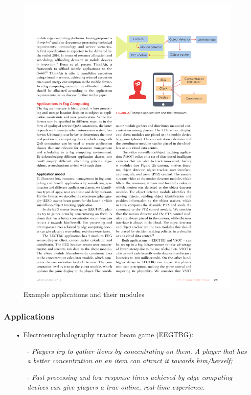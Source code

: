 \documentclass[10pt, pdf, xcolor=pdftex, dvipsnames, table]{beamer}
\begin{document}
\begin{frame}
 	\begin{figure}[htbp]
 		\centerline{\includegraphics[scale=0.9]{images/apps.pdf}}
 		\caption[Example applications and their modules]{Example applications and their modules}
 	\end{figure}
\end{frame}

\begin{frame}
	\frametitle{Applications}
 	\begin{block}{}
 		\begin{itemize}
 		    \item[•] Electroencephalography tractor beam game (EEGTBG):\newline
 				\begin{itemize}
 		    		\item[-] \footnotesize\textit{Players try to gather items by concentrating on them. A player that has a better concentration on an item can attract it towards him/herself;}\newline
 		    		\item[-] \footnotesize\textit{Fast processing and low response times achieved by edge computing devices can give players a true online, real-time experience.}
 		    	\end{itemize}
 		\end{itemize}
 	\end{block}
\end{frame}
\end{document}
